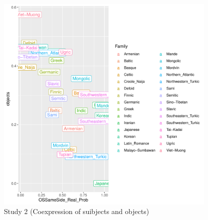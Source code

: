 \documentclass[11pt,a4paper]{article}
\begin{document}
\begin{figure}
    \centering
    \includegraphics[width=0.95\textwidth]{figures/objects-order-families.pdf}
    \caption{Study 2 (Coexpression of suibjects and objects)}
    \label{fig:study2}
\end{figure}









\end{document}

